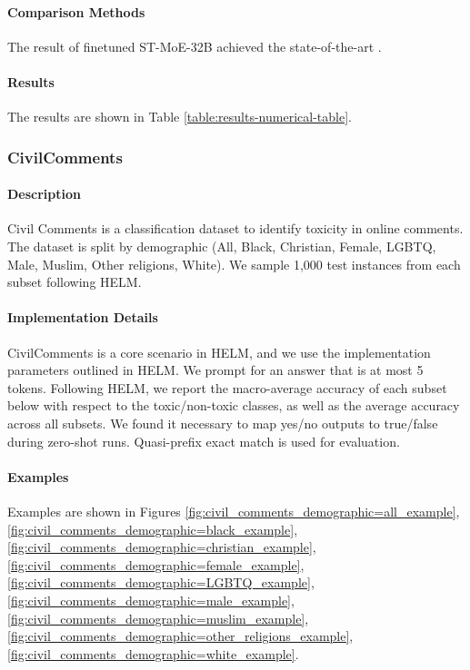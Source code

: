 \paragraph{Comparison Methods}
The result of finetuned ST-MoE-32B achieved the state-of-the-art \citep{zoph2022stmoe}.

\paragraph{Results} The results are shown in Table \ref{table:results-numerical-table}.

\subsubsection{CivilComments} 
\paragraph{Description} Civil Comments \citep{wilds2021, borkan2019nuanced} is a classification dataset to identify toxicity in online comments. The dataset is split by demographic (All, Black, Christian, Female, LGBTQ, Male, Muslim, Other religions, White). We sample 1,000 test instances from each subset following HELM.

\paragraph{Implementation Details}
CivilComments is a core scenario in HELM, and we use the implementation parameters outlined in HELM. We prompt for an answer that is at most 5 tokens. Following HELM, we report the macro-average accuracy of each subset below with respect to the toxic/non-toxic classes, as well as the average accuracy across all subsets. We found it necessary to map yes/no outputs to true/false during zero-shot runs. Quasi-prefix exact match is used for evaluation.

\paragraph{Examples} Examples are shown in Figures \ref{fig:civil_comments_demographic=all_example}, \ref{fig:civil_comments_demographic=black_example}, \ref{fig:civil_comments_demographic=christian_example}, \ref{fig:civil_comments_demographic=female_example}, \ref{fig:civil_comments_demographic=LGBTQ_example}, \ref{fig:civil_comments_demographic=male_example}, \ref{fig:civil_comments_demographic=muslim_example}, \ref{fig:civil_comments_demographic=other_religions_example}, \ref{fig:civil_comments_demographic=white_example}.


